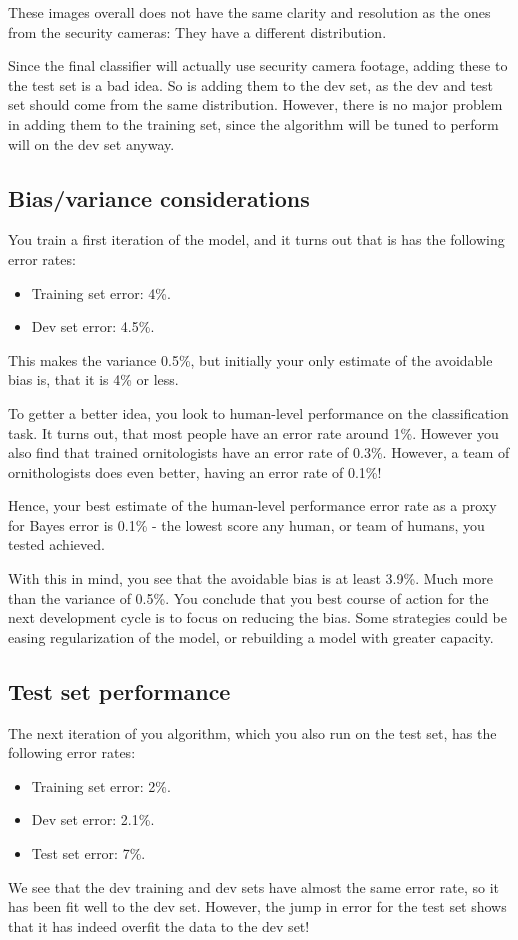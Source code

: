 \documentclass[12pt, a4paper]{article}
\numberwithin{equation}{section}
\begin{document}
These images overall does not have the same clarity and resolution as the ones from the security cameras: They have a different distribution.

Since the final classifier will actually use security camera footage, adding these to the test set is a bad idea. So is adding them to the dev set, as the dev and test set should come from the same distribution. However, there is no major problem in adding them to the training set, since the algorithm will be tuned to perform will on the dev set anyway.

\subsection{Bias/variance considerations}
You train a first iteration of the model, and it turns out that is has the following error rates:
\begin{itemize}
\item Training set error: 4\%.
\item Dev set error: 4.5\%.
\end{itemize}
This makes the variance 0.5\%, but initially your only estimate of the avoidable bias is, that it is 4\% or less.

To getter a better idea, you look to human-level performance on the classification task. It turns out, that most people have an error rate around 1\%. However you also find that trained ornitologists have an error rate of 0.3\%. However, a team of ornithologists does even better, having an error rate of 0.1\%!

Hence, your best estimate of the human-level performance error rate as a proxy for Bayes error is 0.1\% - the lowest score any human, or team of humans, you tested achieved.

With this in mind, you see that the avoidable bias is at least 3.9\%. Much more than the variance of 0.5\%. You conclude that you best course of action for the next development cycle is to focus on reducing the bias. Some strategies could be easing regularization of the model, or rebuilding a model with greater capacity.

\subsection{Test set performance}
The next iteration of you algorithm, which you also run on the test set, has the following error rates:
\begin{itemize}
\item Training set error: 2\%.
\item Dev set error: 2.1\%.
\item Test set error: 7\%.
\end{itemize}
We see that the dev training and dev sets have almost the same error rate, so it has been fit well to the dev set. However, the jump in error for the test set shows that it has indeed overfit the data to the dev set!
\end{document}
